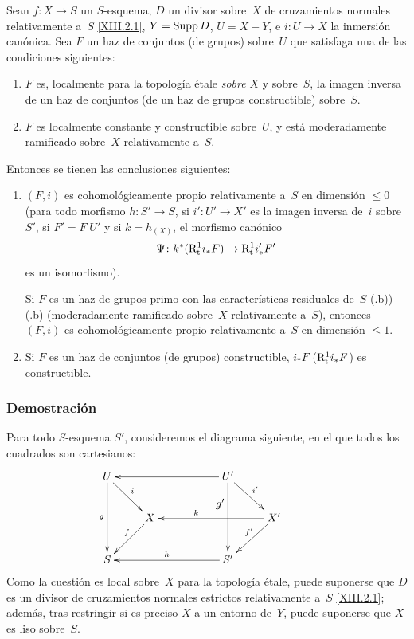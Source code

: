 
\begingroup
\shorthandoff{<>}%
\begin{theoreme}
\label{XIII.2.4}
Sean
$f\colon X\to S$ un $S$-esquema, $D$ un divisor sobre~$X$
de cruzamientos normales relativamente a~$S$ \eqref{XIII.2.1},
$Y=\operatorname{Supp} D$, $U=X-Y$, e $i\colon U\to X$ la inmersión canónica. Sea $F$
un haz de conjuntos (\resp de grupos) sobre~$U$ que satisfaga una de las
condiciones siguientes:
\begin{enumerate}
\item[a)] $F$ es, localmente para la topología étale \emph{sobre}
$X$ y sobre~$S$, la imagen inversa de un haz de conjuntos (\resp de un
haz de grupos constructible) sobre~$S$.
\item[b)] $F$ es localmente constante y constructible sobre~$U$, y está
moderadamente ramificado sobre~$X$ relativamente a~$S$.
\end{enumerate}
Entonces se tienen las conclusiones siguientes:
\begin{enumerate}
\item[1)]$(F,i)$ es cohomológicamente propio relativamente a~$S$
en dimensión $\leq 0$ (\resp para todo morfismo $h\colon S'\to S$, si
$i'\colon U'\to X'$ es la imagen inversa de~$i$ sobre~$S'$, si $F'=F|U'$
y si $k=h_{(X)}$, el morfismo canónico
$$
\Psi\colon k^*(\mathrm{R}^1_{\mathrm{t}}i_*F)\to\mathrm{R}^1_{\mathrm{t}}i_*'F'
$$
es un isomorfismo).

Si $F$ es un haz de grupos primo con las características
residuales de~$S$
{(.b))}
{(.b)}
(moderadamente
ramificado sobre~$X$ relativamente a~$S$), entonces $(F,i)$ es
cohomológicamente propio relativamente a~$S$ en dimensión $\leq 1$.
\item[2)]Si $F$ es un haz de conjuntos (\resp de grupos)
constructible, $i_*F$ (\resp $\mathrm{R}^1_{\mathrm{t}}i_*F$) es constructible.
\end{enumerate}
\end{theoreme}

\subsubsection*{Demostración}
Para todo $S$-esquema $S'$, consideremos el diagrama siguiente,
en el que todos los cuadrados son cartesianos:
$$
\xymatrix{ U \ar[dd]_-g \ar[dr]^-i & & & U'\ar[lll] \ar[dd]_{\hbox{\raise10mm\hbox{$g'$}}}
\ar[dr]^-{i'}& \\ & X \ar[dl]_{f\mkern-8mu} & & & X'\ar[lll]_{k\hspace*{1cm}} \ar[dl]_{f'\mkern-10mu} \\ S
& & & S'\ar[lll]_-h & & }
$$
Como
la cuestión es local sobre~$X$ para la topología étale, puede suponerse
que $D$ es un divisor de cruzamientos normales estrictos relativamente
a~$S$ \eqref{XIII.2.1}; además, tras restringir si es preciso $X$ a un
entorno de~$Y$, puede suponerse que $X$ es liso sobre~$S$.

